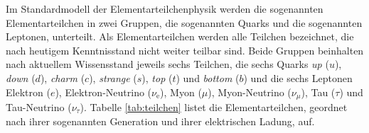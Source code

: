 Im Standardmodell der Elementarteilchenphysik werden die sogenannten Elementarteilchen in zwei Gruppen, die sogenannten Quarks und die sogenannten Leptonen, unterteilt.
Als Elementarteilchen werden alle Teilchen bezeichnet, die nach heutigem Kenntnisstand nicht weiter teilbar sind.
Beide Gruppen beinhalten nach aktuellem Wissensstand jeweils sechs Teilchen, die sechs Quarks \textit{up} ($u$), \textit{down} ($d$), \textit{charm} ($c$), \textit{strange} ($s$), \textit{top} ($t$) und \textit{bottom} ($b$) und die sechs Leptonen Elektron ($e$), Elektron-Neutrino ($\nu_\text{e}$), Myon ($\mu$), Myon-Neutrino ($\nu_{\mu}$), Tau ($\tau$) und Tau-Neutrino ($\nu_{\tau}$).
Tabelle \ref{tab:teilchen} listet die Elementarteilchen, geordnet nach ihrer sogenannten Generation und ihrer elektrischen Ladung, auf.
